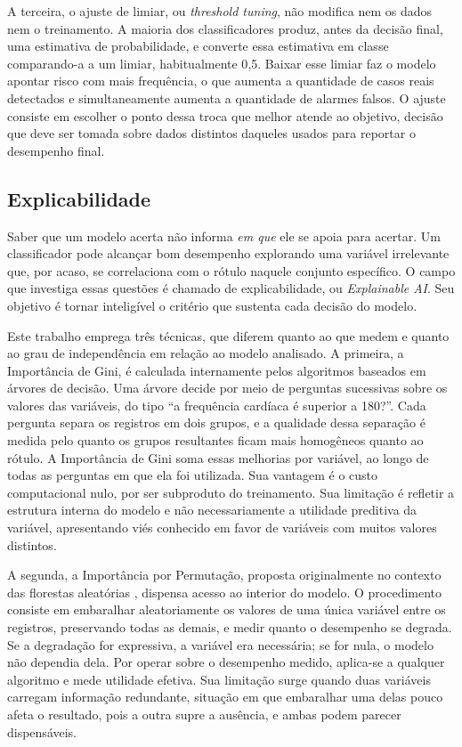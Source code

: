 A terceira, o ajuste de limiar, ou \textit{threshold tuning}, não modifica nem os dados nem o treinamento. A maioria dos classificadores produz, antes da decisão final, uma estimativa de probabilidade, e converte essa estimativa em classe comparando-a a um limiar, habitualmente 0{,}5. Baixar esse limiar faz o modelo apontar risco com mais frequência, o que aumenta a quantidade de casos reais detectados e simultaneamente aumenta a quantidade de alarmes falsos. O ajuste consiste em escolher o ponto dessa troca que melhor atende ao objetivo, decisão que deve ser tomada sobre dados distintos daqueles usados para reportar o desempenho final.

\subsection{Explicabilidade}

Saber que um modelo acerta não informa \textit{em que} ele se apoia para acertar. Um classificador pode alcançar bom desempenho explorando uma variável irrelevante que, por acaso, se correlaciona com o rótulo naquele conjunto específico. O campo que investiga essas questões é chamado de explicabilidade, ou \textit{Explainable AI}. Seu objetivo é tornar inteligível o critério que sustenta cada decisão do modelo.

Este trabalho emprega três técnicas, que diferem quanto ao que medem e quanto ao grau de independência em relação ao modelo analisado. A primeira, a Importância de Gini, é calculada internamente pelos algoritmos baseados em árvores de decisão. Uma árvore decide por meio de perguntas sucessivas sobre os valores das variáveis, do tipo ``a frequência cardíaca é superior a 180?''. Cada pergunta separa os registros em dois grupos, e a qualidade dessa separação é medida pelo quanto os grupos resultantes ficam mais homogêneos quanto ao rótulo. A Importância de Gini soma essas melhorias por variável, ao longo de todas as perguntas em que ela foi utilizada. Sua vantagem é o custo computacional nulo, por ser subproduto do treinamento. Sua limitação é refletir a estrutura interna do modelo e não necessariamente a utilidade preditiva da variável, apresentando viés conhecido em favor de variáveis com muitos valores distintos.

A segunda, a Importância por Permutação, proposta originalmente no contexto das florestas aleatórias \cite{breiman2001}, dispensa acesso ao interior do modelo. O procedimento consiste em embaralhar aleatoriamente os valores de uma única variável entre os registros, preservando todas as demais, e medir quanto o desempenho se degrada. Se a degradação for expressiva, a variável era necessária; se for nula, o modelo não dependia dela. Por operar sobre o desempenho medido, aplica-se a qualquer algoritmo e mede utilidade efetiva. Sua limitação surge quando duas variáveis carregam informação redundante, situação em que embaralhar uma delas pouco afeta o resultado, pois a outra supre a ausência, e ambas podem parecer dispensáveis.

